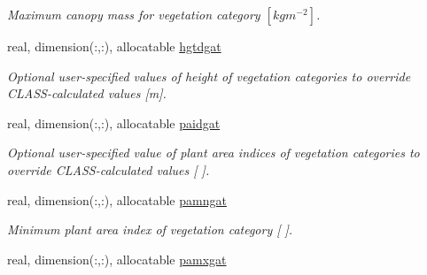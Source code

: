 \begin{DoxyCompactItemize}
\begin{DoxyCompactList}\small\item\em Maximum canopy mass for vegetation category $[kg m^{-2} ]$. \end{DoxyCompactList}\item 
\hypertarget{structclass__statevars_1_1class__gather_a71528d1d2f19a2f48675ba8de688f7e5}{}real, dimension(\+:,\+:), allocatable \hyperlink{structclass__statevars_1_1class__gather_a71528d1d2f19a2f48675ba8de688f7e5}{hgtdgat}\label{structclass__statevars_1_1class__gather_a71528d1d2f19a2f48675ba8de688f7e5}

\begin{DoxyCompactList}\small\item\em Optional user-\/specified values of height of vegetation categories to override C\+L\+A\+S\+S-\/calculated values \mbox{[}m\mbox{]}. \end{DoxyCompactList}\item 
\hypertarget{structclass__statevars_1_1class__gather_a557ea36dcb5866b6ab7f13eede7eacc2}{}real, dimension(\+:,\+:), allocatable \hyperlink{structclass__statevars_1_1class__gather_a557ea36dcb5866b6ab7f13eede7eacc2}{paidgat}\label{structclass__statevars_1_1class__gather_a557ea36dcb5866b6ab7f13eede7eacc2}

\begin{DoxyCompactList}\small\item\em Optional user-\/specified value of plant area indices of vegetation categories to override C\+L\+A\+S\+S-\/calculated values \mbox{[} \mbox{]}. \end{DoxyCompactList}\item 
\hypertarget{structclass__statevars_1_1class__gather_a9078db81f2e4e41684f96467e89826c7}{}real, dimension(\+:,\+:), allocatable \hyperlink{structclass__statevars_1_1class__gather_a9078db81f2e4e41684f96467e89826c7}{pamngat}\label{structclass__statevars_1_1class__gather_a9078db81f2e4e41684f96467e89826c7}

\begin{DoxyCompactList}\small\item\em Minimum plant area index of vegetation category \mbox{[} \mbox{]}. \end{DoxyCompactList}\item 
\hypertarget{structclass__statevars_1_1class__gather_abdb2670f3f1400ca45e32b1f2f71acdc}{}real, dimension(\+:,\+:), allocatable \hyperlink{structclass__statevars_1_1class__gather_abdb2670f3f1400ca45e32b1f2f71acdc}{pamxgat}\label{structclass__statevars_1_1class__gather_abdb2670f3f1400ca45e32b1f2f71acdc}


\end{DoxyCompactItemize}
